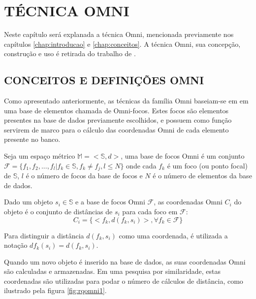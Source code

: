 \chapter{TÉCNICA OMNI}
\label{chap:omni}

Neste capítulo será explanada a técnica Omni, mencionada previamente nos capítulos \ref{chap:introducao} e \ref{chap:conceitos}.
A técnica Omni, sua concepção, construção e uso é retirada do trabalho de \cite{Traina2001}.

\section{CONCEITOS E DEFINIÇÕES OMNI}
\label{sec:defomni}
Como apresentado anteriormente, as técnicas da família Omni baseiam-se em em uma base de elementos chamada de 
Omni-focos. Estes focos são elementos presentes na base de dados previamente escolhidos, e possuem como função 
servirem de marco para o cálculo das coordenadas Omni de cada elemento presente no banco.

\begin{mydef}
 \label{def:omnifoco}
 Seja um espaço métrico $\mathbb{M} = <\mathbb{S},d>$, uma base de focos Omni é um conjunto 
 $\mathscr{F} = \{f_1, f_2, ..., f_l | f_k \in \mathbb{S}, f_k \neq f_j, l \leq N \}$ onde cada $f_k$ é um foco
 (ou ponto focal) de $\mathbb{S}$, $l$ é o número de focos da base de focos e $N$ é o número de elementos da base de dados.
\end{mydef}

\begin {mydef}
 \label{def:omnicoord}
 Dado um objeto $s_i \in \mathbb{S}$ e a base de focos Omni $\mathscr{F}$, as coordenadas Omni $C_i$ do objeto é o conjunto
 de distâncias de $s_i$ para cada foco em $\mathscr{F}$:
 \begin{equation}
  C_i = \{ <f_k, d(f_k, s_i)>, \forall f_k \in \mathscr{F} \}
 \end{equation}
\end {mydef}

Para distinguir a distância $d(f_k, s_i)$ como uma coordenada, é utilizada a notação $df_k(s_i) = d(f_k, s_i)$.\par
Quando um novo objeto é inserido na base de dados, as suas coordenadas Omni são calculadas e armazenadas. Em uma pesquisa por
similaridade, estas coordenadas são utilizadas para podar o número de cálculos de distância, como ilustrado pela figura \ref{fig:rqomni1}.\par

